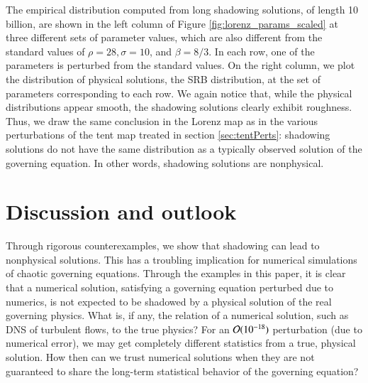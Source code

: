 \documentclass[preprint,12pt]{elsarticle}
\begin{document}
The empirical distribution computed from long shadowing solutions, of length 10 billion, are shown in the left column of Figure \ref{fig:lorenz_params_scaled} at three different sets of parameter values, which are also different from the standard values of $\rho = 28, \sigma = 10$, and $\beta = 8/3$. 
In each row, one of the parameters is perturbed from the standard values. On the right column, we plot the distribution of physical solutions, the SRB distribution, at the set of parameters corresponding to each row. We again notice that, while the physical distributions appear smooth, the shadowing solutions clearly exhibit roughness. Thus, we draw the same conclusion in the Lorenz map as in the various perturbations of the tent map treated in section \ref{sec:tentPerts}: shadowing solutions do not have the same distribution as a typically observed solution of the governing equation. In other words, shadowing solutions are nonphysical.


\section{Discussion and outlook}
\label{sec:discussion}
Through rigorous counterexamples, we show that shadowing can lead
to nonphysical solutions. This has a troubling implication for numerical simulations of chaotic
governing equations.  Through the examples in this paper, it is clear that a numerical solution, satisfying
a governing equation perturbed due to numerics, is not 
expected to be shadowed by a
physical solution of the real governing physics.  What is, if any, the
relation of a numerical solution, such as DNS of turbulent flows, to
the true physics? For an ${\cal O}(10^{-18})$ 
perturbation (due to numerical error), 
we may get completely different statistics from a true, physical solution. How then can we trust numerical solutions when they are not guaranteed to share the long-term statistical behavior of the governing equation? 
\end{document}
